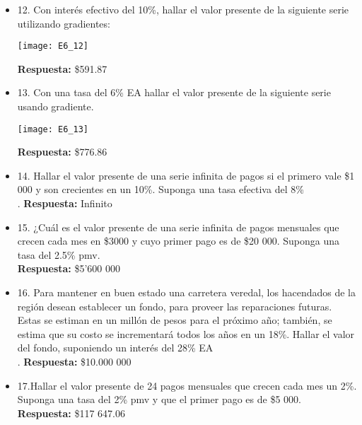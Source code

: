 \begin{itemize}
	\item 12. Con interés efectivo del 10\%, hallar el valor presente de la siguiente serie utilizando gradientes:\\
	\begin{center}
		\texttt{[image: E6\_12]}
	\end{center}
	\textbf{Respuesta:} \$591.87\\
	\medskip
	
	\item 13. Con una tasa del 6\% EA hallar el valor presente de la siguiente serie usando gradiente.\\
	\begin{center}
		\texttt{[image: E6\_13]}
	\end{center}
	\textbf{Respuesta:} \$776.86\\
	\medskip
	
	\item 14. Hallar el valor presente de una serie infinita de pagos si el primero vale \$1 000 y son crecientes en un 10\%. Suponga una tasa efectiva del 8\%\\.
	\textbf{Respuesta:} Infinito\\
	\medskip
	
	\item 15. ¿Cuál es el valor presente de una serie infinita de pagos mensuales que crecen cada mes en \$3000 y cuyo primer pago es de \$20 000. Suponga una tasa del 2.5\% pmv.\\
	\textbf{Respuesta:} \$5'600 000\\
	\medskip
	
	\item 16. Para mantener en buen estado una carretera veredal, los hacendados de la región desean establecer un fondo, para proveer las reparaciones futuras. Estas se estiman en un millón de pesos para el próximo año; también, se estima que su costo se incrementará todos los años en un 18\%. Hallar el valor del fondo, suponiendo un interés del 28\% EA\\.
	\textbf{Respuesta:} \$10.000 000\\
	\medskip
	
	\item 17.Hallar el valor presente de 24 pagos mensuales que crecen cada mes un 2\%. Suponga una tasa del 2\% pmv y que el primer pago es de \$5 000.\\
	\textbf{Respuesta:} \$117 647.06\\
	\medskip
	

\end{itemize}
